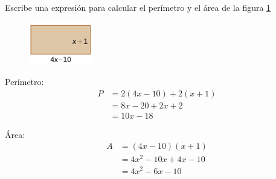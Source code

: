 Escribe una expresión para calcular el perímetro y el área de la figura \ref{fig:20230319044600}

\begin{figure}[H]
    \centering
    \includegraphics[width=0.25\textwidth]{../images/20230319044600}
    \caption{}
    \label{fig:20230319044600}
\end{figure}


\begin{solutionbox}{3.5cm}
    \begin{multicols}{2}
      Perímetro:
      \begin{align*}
        P & =2(4x-10)+2(x+1) \\
          & =8x-20+2x+2      \\
          & =10x-18
        \end{align*}

      Área:
      \begin{align*}
        A & =(4x-10)(x+1)     \\
          & =4x^2-10x+4x-10  \\
          & =4x^2-6x-10
      \end{align*}
    \end{multicols}
  \end{solutionbox}